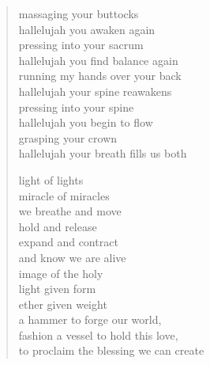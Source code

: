\begin{verse}
massaging your buttocks \\
hallelujah you awaken again \\
pressing into your sacrum \\
hallelujah you find balance again \\
running my hands over your back \\
hallelujah your spine reawakens \\
pressing into your spine \\
hallelujah you begin to flow \\
grasping your crown \\
hallelujah your breath fills us both

light of lights \\
miracle of miracles \\
we breathe and move \\
hold and release \\
expand and contract \\
and know we are alive \\
image of the holy  \\
light given form \\
ether given weight \\
a hammer to forge our world, \\
fashion a vessel to hold this love, \\
to proclaim the blessing we can create
\end{verse}
